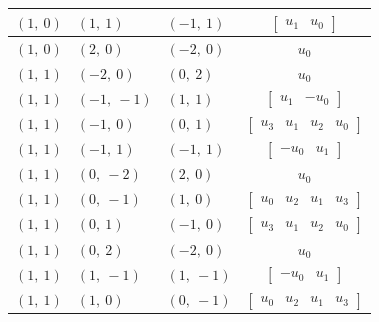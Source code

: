 \documentclass[11pt]{article}
\theoremstyle{definition}
\begin{document}
\begin{longtable}{|l|l|l|c|}
    \hline
    $\left( 1, \  0\right)$ & $\left( 1, \  1\right)$ & $\left( -1, \  1\right)$ & $\left[\begin{matrix}u_{1} & u_{0}\end{matrix}\right]$ \\
    \hline
    $\left( 1, \  0\right)$ & $\left( 2, \  0\right)$ & $\left( -2, \  0\right)$ & $u_{0}$ \\
    \hline
    $\left( 1, \  1\right)$ & $\left( -2, \  0\right)$ & $\left( 0, \  2\right)$ & $u_{0}$ \\
    \hline
    $\left( 1, \  1\right)$ & $\left( -1, \  -1\right)$ & $\left( 1, \  1\right)$ & $\left[\begin{matrix}u_{1} & - u_{0}\end{matrix}\right]$ \\
    \hline
    $\left( 1, \  1\right)$ & $\left( -1, \  0\right)$ & $\left( 0, \  1\right)$ & $\left[\begin{matrix}u_{3} & u_{1} & u_{2} & u_{0}\end{matrix}\right]$ \\
    \hline
    $\left( 1, \  1\right)$ & $\left( -1, \  1\right)$ & $\left( -1, \  1\right)$ & $\left[\begin{matrix}- u_{0} & u_{1}\end{matrix}\right]$ \\
    \hline
    $\left( 1, \  1\right)$ & $\left( 0, \  -2\right)$ & $\left( 2, \  0\right)$ & $u_{0}$ \\
    \hline
    $\left( 1, \  1\right)$ & $\left( 0, \  -1\right)$ & $\left( 1, \  0\right)$ & $\left[\begin{matrix}u_{0} & u_{2} & u_{1} & u_{3}\end{matrix}\right]$ \\
    \hline
    $\left( 1, \  1\right)$ & $\left( 0, \  1\right)$ & $\left( -1, \  0\right)$ & $\left[\begin{matrix}u_{3} & u_{1} & u_{2} & u_{0}\end{matrix}\right]$ \\
    \hline
    $\left( 1, \  1\right)$ & $\left( 0, \  2\right)$ & $\left( -2, \  0\right)$ & $u_{0}$ \\
    \hline
    $\left( 1, \  1\right)$ & $\left( 1, \  -1\right)$ & $\left( 1, \  -1\right)$ & $\left[\begin{matrix}- u_{0} & u_{1}\end{matrix}\right]$ \\
    \hline
    $\left( 1, \  1\right)$ & $\left( 1, \  0\right)$ & $\left( 0, \  -1\right)$ & $\left[\begin{matrix}u_{0} & u_{2} & u_{1} & u_{3}\end{matrix}\right]$ \\

\end{longtable}
\end{document}
